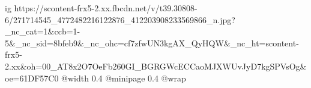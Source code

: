  
 
 
 
 

\ifcmt
  ig https://scontent-frx5-2.xx.fbcdn.net/v/t39.30808-6/271714545_4772482216122876_412203908233569866_n.jpg?_nc_cat=1&ccb=1-5&_nc_sid=8bfeb9&_nc_ohc=cf7zfwUN3kgAX_QyHQW&_nc_ht=scontent-frx5-2.xx&oh=00_AT8x2O7OeFb260GI_BGRGWcECCaoMJXWUvJyD7kgSPVsOg&oe=61DF57C0
  @width 0.4
  @minipage 0.4
  @wrap \parpic[r]
\fi
